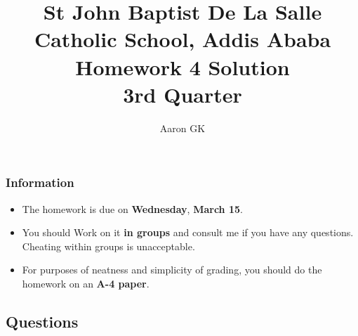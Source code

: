 \documentclass[9pt,addpoints]{exam}
\author{Aaron GK}
\begin{document}
	\title{St John Baptist De La Salle Catholic School, Addis Ababa\\
		\large Homework 4 Solution\\
		3rd Quarter}
	\maketitle
	\begin{center}
		\subsubsection*{Information}
		\begin{itemize}
			\item The homework is due on \textbf{Wednesday}, \textbf{March 15}.
			\item You should Work on it \textbf{in groups} and consult me if you have any questions. Cheating within groups is unacceptable.
			\item For purposes of neatness and simplicity of grading, you should do the homework on an \textbf{A-4 paper}.
		\end{itemize}
	\end{center}
	\begin{center}
		\subsection*{Questions}
	\end{center}
\end{document}
